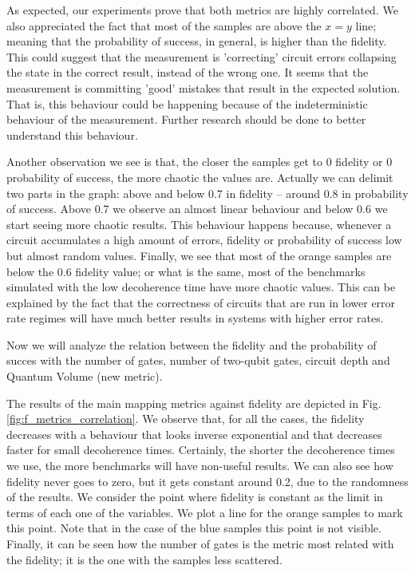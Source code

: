 As expected, our experiments prove that both metrics are highly correlated.
We also appreciated the fact that most of the samples are above the \(x=y\) line; meaning that the probability of success, in general, is higher than the fidelity.
This could suggest that the measurement is 'correcting' circuit errors collapsing the state in the correct result, instead of the wrong one.
It seems that the measurement is committing 'good' mistakes that result in the expected solution.
That is, this behaviour could be happening because of the indeterministic behaviour of the measurement.
Further research should be done to better understand this behaviour.

Another observation we see is that, the closer the samples get to 0 fidelity or 0 probability of success, the more chaotic the values are. Actually we can delimit two parts in the graph: above and below 0.7 in fidelity -- around 0.8 in probability of success. Above 0.7 we observe an almost linear behaviour and below 0.6 we start seeing more chaotic results. This behaviour happens because, whenever a circuit accumulates a high amount of errors, fidelity or probability of success low but almost random values.
Finally, we see that most of the orange samples are below the 0.6 fidelity value; or what is the same, most of the benchmarks simulated with the low decoherence time have more chaotic values. 
This can be explained by the fact that the correctness of circuits that are run in lower error rate regimes will have much better results in systems with higher error rates.

Now we will analyze the relation between the fidelity and the probability of succes with the number of gates, number of two-qubit gates, circuit depth and Quantum Volume (new metric).


The results of the main mapping metrics against fidelity are depicted in Fig. \ref{fig:f_metrics_correlation}.
We observe that, for all the cases, the fidelity decreases with a behaviour that looks inverse exponential and that decreases faster for small decoherence times.
Certainly, the shorter the decoherence times we use, the more benchmarks will have non-useful results.
We can also see how fidelity never goes to zero, but it gets constant around 0.2, due to the randomness of the results.
We consider the point where fidelity is constant as the limit in terms of each one of the variables.
We plot a line for the orange samples to mark this point.
Note that in the case of the blue samples this point is not visible.
Finally, it can be seen how the number of gates is the metric most related with the fidelity; it is the one with the samples less scattered.

